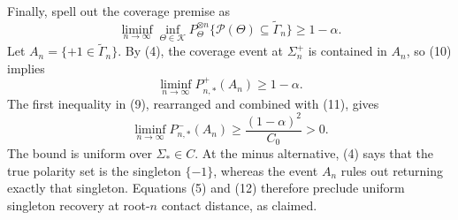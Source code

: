 Finally, spell out the coverage premise as
\[
 \liminf_{n\to\infty}\inf_{\Theta\in\mathcal K}
 P_\Theta^{\otimes n}
 \{\mathcal P(\Theta)\subseteq\widetilde\Gamma_n\}
 \ge1-\alpha. \tag{10}
\]
Let \(A_n=\{+1\in\widetilde\Gamma_n\}\).  By (4), the coverage event at \(\Sigma_n^+\) is contained in \(A_n\), so (10) implies
\[
 \liminf_{n\to\infty}P_{n,*}^+(A_n)\ge1-\alpha. \tag{11}
\]
The first inequality in (9), rearranged and combined with (11), gives
\[
 \liminf_{n\to\infty}P_{n,*}^-(A_n)
 \ge \frac{(1-\alpha)^2}{C_0}>0. \tag{12}
\]
The bound is uniform over \(\Sigma_*\in C\).  At the minus alternative, (4) says that the true polarity set is the singleton \(\{-1\}\), whereas the event \(A_n\) rules out returning exactly that singleton.  Equations (5) and (12) therefore preclude uniform singleton recovery at root-\(n\) contact distance, as claimed.

